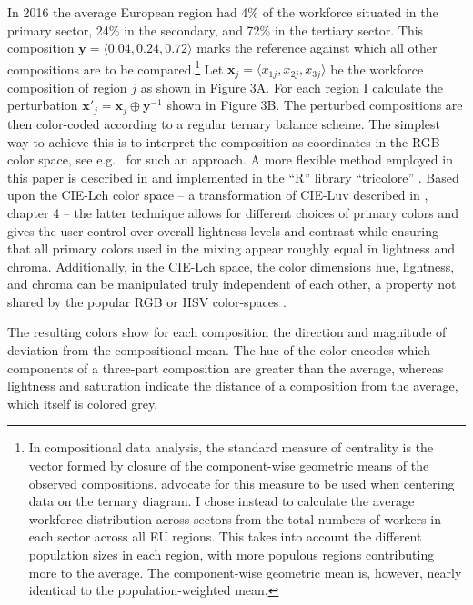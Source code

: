 \documentclass[10pt, twoside, parskip=half]{article}
\begin{document}
In 2016 the average European region had 4\% of the workforce situated in
the primary sector, 24\% in the secondary, and 72\% in the tertiary
sector. This composition \(\mathbf{y}=\langle 0.04, 0.24, 0.72 \rangle\)
marks the reference against which all other compositions are to be
compared.\footnote{In compositional data analysis, the standard measure
  of centrality is the vector formed by closure of the component-wise
  geometric means of the observed compositions. \citet{VonEynatten2002}
  advocate for this measure to be used when centering data on the
  ternary diagram. I chose instead to calculate the average workforce
  distribution across sectors from the total numbers of workers in each
  sector across all EU regions. This takes into account the different
  population sizes in each region, with more populous regions
  contributing more to the average. The component-wise geometric mean
  is, however, nearly identical to the population-weighted mean. } Let
\(\mathbf{x}_j = \langle x_{1j}, x_{2j}, x_{3j} \rangle\) be the
workforce composition of region \(j\) as shown in Figure 3A. For each
region I calculate the perturbation
\(\mathbf{x}'_j = \mathbf{x}_j \oplus \mathbf{y}^{-1}\) shown in Figure
3B. The perturbed compositions are then color-coded according to a
regular ternary balance scheme. The simplest way to achieve this is to
interpret the composition as coordinates in the RGB color space, see
e.g.~\citet{Wang2009} for such an approach. A more flexible method
employed in this paper is described in \citet{Schoeley2017} and
implemented in the ``R'' library ``tricolore'' \citep{Schoeley2019a}.
Based upon the CIE-Lch color space -- a transformation of CIE-Luv
described in \citet{Ware2013}, chapter 4 -- the latter technique allows
for different choices of primary colors and gives the user control over
overall lightness levels and contrast while ensuring that all primary
colors used in the mixing appear roughly equal in lightness and chroma.
Additionally, in the CIE-Lch space, the color dimensions hue, lightness,
and chroma can be manipulated truly independent of each other, a
property not shared by the popular RGB or HSV color-spaces
\citep{Zeileis2009}.

The resulting colors show for each composition the direction and
magnitude of deviation from the compositional mean. The hue of the color
encodes which components of a three-part composition are greater than
the average, whereas lightness and saturation indicate the distance of a
composition from the average, which itself is colored grey.
\end{document}
